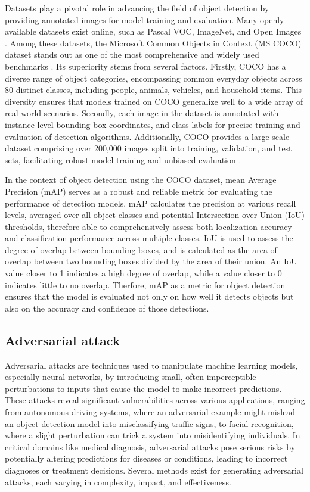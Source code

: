 \documentclass[journal,onecolumn,12pt]{IEEEtran}
\begin{document}
Datasets play a pivotal role in advancing the field of object detection by providing annotated images for model training and evaluation. Many openly available datasets exist online, such as Pascal VOC, ImageNet, and Open Images \cite{zaidi2021survey}. Among these datasets, the Microsoft Common Objects in Context (MS COCO) dataset stands out as one of the most comprehensive and widely used benchmarks \cite{lin2015microsoft}. Its superiority stems from several factors. Firstly, COCO has a diverse range of object categories, encompassing common everyday objects across 80 distinct classes, including people, animals, vehicles, and household items. This diversity ensures that models trained on COCO generalize well to a wide array of real-world scenarios. Secondly, each image in the dataset is annotated with instance-level bounding box coordinates, and class labels for precise training and evaluation of detection algorithms. Additionally, COCO provides a large-scale dataset comprising over 200,000 images split into training, validation, and test sets, facilitating robust model training and unbiased evaluation \cite{lin2015microsoft}.

In the context of object detection using the COCO dataset, mean Average Precision (mAP) serves as a robust and reliable metric for evaluating the performance of detection models. mAP calculates the precision at various recall levels, averaged over all object classes and potential Intersection over Union (IoU) thresholds, therefore able to comprehensively assess both localization accuracy and classification performance across multiple classes. IoU is used to assess the degree of overlap between bounding boxes, and is calculated as the area of overlap between two bounding boxes divided by the area of their union. An IoU value closer to 1 indicates a high degree of overlap, while a value closer to 0 indicates little to no overlap. Therfore, mAP as a metric for object detection ensures that the model is evaluated not only on how well it detects objects but also on the accuracy and confidence of those detections.

\subsection{Adversarial attack}
Adversarial attacks are techniques used to manipulate machine learning models, especially neural networks, by introducing small, often imperceptible perturbations to inputs that cause the model to make incorrect predictions. These attacks reveal significant vulnerabilities across various applications, ranging from autonomous driving systems, where an adversarial example might mislead an object detection model into misclassifying traffic signs, to facial recognition, where a slight perturbation can trick a system into misidentifying individuals. In critical domains like medical diagnosis, adversarial attacks pose serious risks by potentially altering predictions for diseases or conditions, leading to incorrect diagnoses or treatment decisions. Several methods exist for generating adversarial attacks, each varying in complexity, impact, and effectiveness. 
\end{document}
